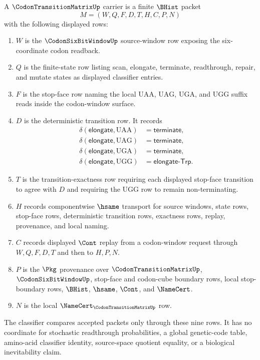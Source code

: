 \begin{definition}
\label{def:codon-transition-matrix-carrier}
A $\CodonTransitionMatrixUp$ carrier is a finite $\BHist$ packet
$$
M=(W,Q,F,D,T,H,C,P,N)
$$
with the following displayed rows:
\begin{enumerate}
\item $W$ is the $\CodonSixBitWindowUp$ source-window row exposing the six-coordinate codon readback.
\item $Q$ is the finite-state row listing scan, elongate, terminate, readthrough, repair, and mutate states as displayed classifier entries.
\item $F$ is the stop-face row naming the local $\mathrm{UAA}$, $\mathrm{UAG}$, $\mathrm{UGA}$, and $\mathrm{UGG}$ suffix reads inside the codon-window surface.
\item $D$ is the deterministic transition row. It records
$$
\begin{aligned}
\delta(\mathsf{elongate},\mathrm{UAA}) &= \mathsf{terminate},\\
\delta(\mathsf{elongate},\mathrm{UAG}) &= \mathsf{terminate},\\
\delta(\mathsf{elongate},\mathrm{UGA}) &= \mathsf{terminate},\\
\delta(\mathsf{elongate},\mathrm{UGG}) &= \mathsf{elongate\text{-}Trp}.
\end{aligned}
$$
\item $T$ is the transition-exactness row requiring each displayed stop-face transition to agree with $D$ and requiring the $\mathrm{UGG}$ row to remain non-terminating.
\item $H$ records componentwise $\hsame$ transport for source windows, state rows, stop-face rows, deterministic transition rows, exactness rows, replay, provenance, and local naming.
\item $C$ records displayed $\Cont$ replay from a codon-window request through $W,Q,F,D,T$ and then to $H,P,N$.
\item $P$ is the $\Pkg$ provenance over $\CodonTransitionMatrixUp$, $\CodonSixBitWindowUp$, stop-face and codon-cube boundary rows, local stop-boundary rows, $\BHist$, $\hsame$, $\Cont$, and $\NameCert$.
\item $N$ is the local $\NameCert_{\CodonTransitionMatrixUp}$ row.
\end{enumerate}
The classifier compares accepted packets only through these nine rows. It has no coordinate for stochastic readthrough probabilities, a global genetic-code table, amino-acid classifier identity, source-space quotient equality, or a biological inevitability claim.
\end{definition}


